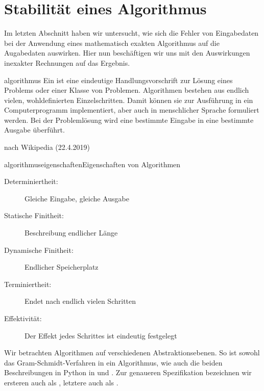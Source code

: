 \section{Stabilität eines Algorithmus}

\begin{intro}
  Im letzten Abschnitt haben wir untersucht, wie sich die Fehler von
  Eingabedaten bei der Anwendung eines mathematisch exakten
  Algorithmus auf die Augabedaten auswirken. Hier nun beschäftigen wir
  uns mit den Auswirkungen inexakter Rechnungen auf das Ergebnis.
\end{intro}

\begin{Definition}{algorithmus}
  Ein  ist eine eindeutige Handlungsvorschrift zur Lösung
  eines Problems oder einer Klasse von Problemen. Algorithmen bestehen
  aus endlich vielen, wohldefinierten Einzelschritten. Damit können
  sie zur Ausführung in ein Computerprogramm implementiert, aber auch
  in menschlicher Sprache formuliert werden. Bei der Problemlösung
  wird eine bestimmte Eingabe in eine bestimmte Ausgabe überführt.

  \hfill nach Wikipedia (22.4.2019)
\end{Definition}

\begin{Bemerkung*}{algorithmuseigenschaften}{Eigenschaften von Algorithmen}
  \begin{description}
  \item[Determiniertheit:] Gleiche Eingabe, gleiche Ausgabe
  \item[Statische Finitheit:] Beschreibung endlicher Länge
  \item[Dynamische Finitheit:] Endlicher Speicherplatz
  \item[Terminiertheit:] Endet nach endlich vielen Schritten
  \item[Effektivität:] Der Effekt jedes Schrittes ist eindeutig festgelegt
  \end{description}
\end{Bemerkung*}

\begin{remark}
  Wir betrachten Algorithmen auf verschiedenen Abstraktionsebenen. So
  ist sowohl das Gram-Schmidt-Verfahren in
   ein Algorithmus, wie auch die
  beiden Beschreibungen in Python in
   und
  . Zur genaueren Spezifikation bezeichnen
  wir ersteren auch als , letztere
  auch als .
\end{remark}

